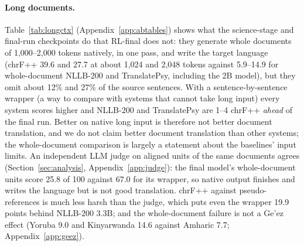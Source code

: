 \paragraph{Long documents.} Table~\ref{tab:longctx} (Appendix~\ref{app:abtables}) shows what the science-stage and final-run checkpoints do that RL-final does not: they generate whole documents of 1,000--2,000 tokens natively, in one pass, and write the target language (chrF++ 39.6 and 27.7 at about 1,024 and 2,048 tokens against 5.9--14.9 for whole-document NLLB-200 and TranslatePsy, including the 2B model), but they omit about 12\% and 27\% of the source sentences. With a sentence-by-sentence wrapper (a way to compare with systems that cannot take long input) every system scores higher and NLLB-200 and TranslatePsy are 1--4 chrF++ \emph{ahead} of the final run. Better on native long input is therefore not better document translation, and we do not claim better document translation than other systems; the whole-document comparison is largely a statement about the baselines' input limits. An independent LLM judge on aligned units of the same documents agrees (Section~\ref{sec:analysis}, Appendix~\ref{app:judge}): the final model's whole-document units score 25.8 of 100 against 67.0 for its wrapper, so native output finishes and writes the language but is not good translation. chrF++ against pseudo-references is much less harsh than the judge, which puts even the wrapper 19.9 points behind NLLB-200 3.3B; and the whole-document failure is not a Ge'ez effect (Yoruba 9.0 and Kinyarwanda 14.6 against Amharic 7.7; Appendix~\ref{app:geez}).

